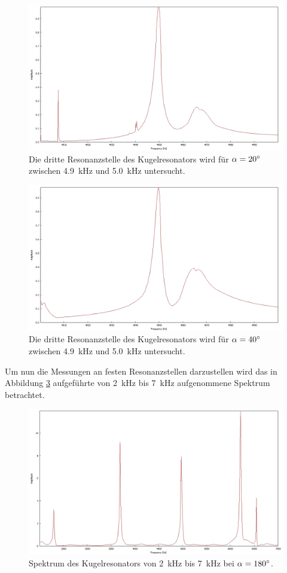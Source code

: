 \begin{figure}
\centering
\includegraphics[width=\textwidth]{content/messungen/Chapter2new/2_2_20mg.jpg}
\caption{Die dritte Resonanzstelle des Kugelresonators wird für $\alpha=20\degree$ zwischen 4.9~kHz und 5.0~kHz untersucht.}
\label{fig:2_2_20}
\end{figure}
\begin{figure}
\centering
\includegraphics[width=\textwidth]{content/messungen/Chapter2new/2_2_40mg.jpg}
\caption{Die dritte Resonanzstelle des Kugelresonators wird für $\alpha=40\degree$ zwischen 4.9~kHz und 5.0~kHz untersucht.}
\label{fig:2_2_40}
\end{figure}
Um nun die Messungen an festen Resonanzstellen darzustellen wird das in Abbildung \ref{fig:2_3_180} aufgeführte von 2~kHz bis 7~kHz aufgenommene Spektrum betrachtet.
\begin{figure}
\centering
\includegraphics[width=\textwidth]{content/messungen/Chapter2new/2_3_180mg.jpg}
\caption{Spektrum des Kugelresonators von 2~kHz bis 7~kHz bei $\alpha=180\degree$.}
\label{fig:2_3_180}
\end{figure}
